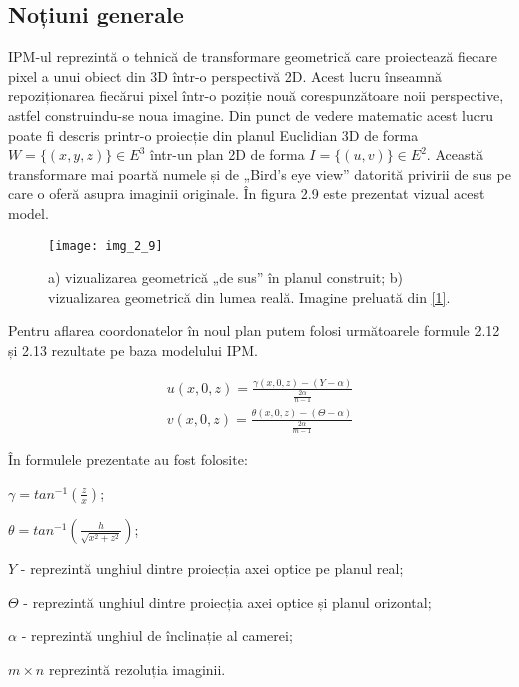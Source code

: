 \subsection{Noțiuni generale}

IPM-ul reprezintă o tehnică de transformare geometrică care proiectează fiecare pixel a unui obiect din 3D într-o perspectivă 2D. Acest lucru înseamnă repoziționarea fiecărui pixel într-o poziție nouă corespunzătoare noii perspective, astfel construindu-se noua imagine. Din punct de vedere matematic acest lucru poate fi descris printr-o proiecție din planul Euclidian 3D de forma $W = \{(x,y,z)\} \in E^3$ într-un plan 2D de forma $I = \{(u,v)\} \in E^2$. Această transformare mai poartă numele și de „Bird's eye view” datorită privirii de sus pe care o oferă asupra imaginii originale. În figura 2.9 este prezentat vizual acest model.

\begin{figure}[!h]
	\centering
	\texttt{[image: img\_2\_9]}
	\caption[Modelul IPM]{a) vizualizarea geometrică „de sus” în planul construit; b) vizualizarea geometrică din lumea reală. Imagine preluată din \hyperlink{AnuarMikdadMuadAiniHussainSalinaAbdulSamadMohdMarzukiMustaffaBurhanuddinYeopMajlis}{[1]}.}
	\label{fig:nonfloat}
\end{figure}

Pentru aflarea coordonatelor în noul plan putem folosi următoarele formule 2.12 și 2.13 rezultate pe baza modelului IPM.

\begin{align}	
	u(x,0,z) = \frac{\gamma(x,0,z) - (Y-\alpha)}{\frac{2\alpha}{n-1}}
\end{align}
\begin{align}	
	v(x,0,z) = \frac{\theta(x,0,z) - (\Theta - \alpha)}{\frac{2\alpha}{m-1}}
\end{align}

În formulele prezentate au fost folosite:

$\gamma = tan^{-1}(\frac{z}{x})$;

$\theta = tan^{-1}(\frac{h}{\sqrt{x^2+z^2}})$;

$Y$ - reprezintă unghiul dintre proiecția axei optice pe planul real; 

$\Theta$ - reprezintă unghiul dintre proiecția axei optice și planul orizontal;
 
$\alpha$ - reprezintă unghiul de înclinație al camerei;

$m \times n$ reprezintă rezoluția imaginii.

